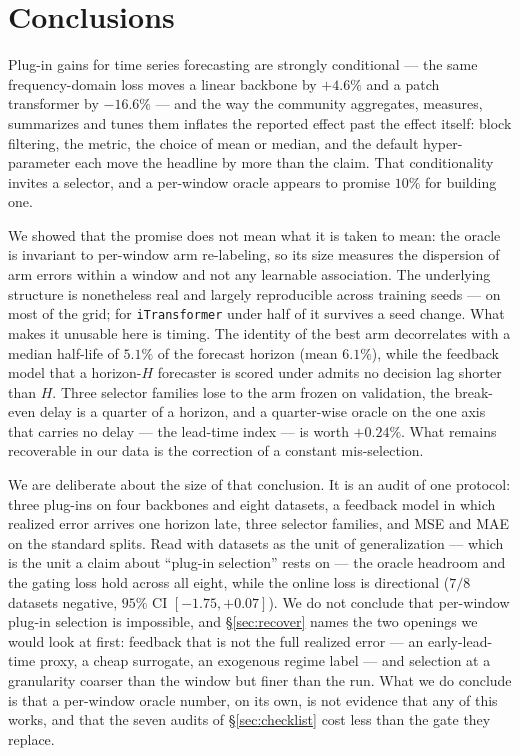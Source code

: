 \documentclass[a4paper,fleqn]{cas-sc}
\newcommand{\arm}[1]{\texttt{#1}}
\begin{document}
\section{Conclusions}

Plug-in gains for time series forecasting are strongly conditional --- the same
frequency-domain loss moves a linear backbone by $+4.6\%$ and a patch
transformer by $-16.6\%$ --- and the way the community aggregates, measures,
summarizes and tunes them inflates the reported effect past the effect itself:
block filtering, the metric, the choice of mean or median, and the default
hyper-parameter each move the headline by more than the claim. That
conditionality invites a selector, and a per-window oracle appears to promise
$10\%$ for building one.

We showed that the promise does not mean what it is taken to mean: the oracle is
invariant to per-window arm re-labeling, so its size measures the dispersion of arm
errors within a window and not any learnable association. The underlying structure
is nonetheless real and largely reproducible across training seeds --- on most of
the grid; for \arm{iTransformer} under half of it survives a seed change. What
makes it unusable here is timing. The identity of the best arm decorrelates with a
median half-life of $5.1\%$ of the forecast horizon (mean $6.1\%$), while the
feedback model that a horizon-$H$ forecaster is scored under admits no decision lag
shorter than $H$. Three selector families lose to the arm frozen on validation, the
break-even delay is a quarter of a horizon, and a quarter-wise oracle on the one
axis that carries no delay --- the lead-time index --- is worth $+0.24\%$. What
remains recoverable in our data is the correction of a constant mis-selection.

We are deliberate about the size of that conclusion. It is an audit of one
protocol: three plug-ins on four backbones and eight datasets, a feedback model in
which realized error arrives one horizon late, three selector families, and MSE and
MAE on the standard splits. Read with datasets as the unit of generalization ---
which is the unit a claim about ``plug-in selection'' rests on --- the oracle
headroom and the gating loss hold across all eight, while the online loss is
directional ($7/8$ datasets negative, $95\%$ CI $[-1.75, +0.07]$). We do not
conclude that per-window plug-in selection is impossible, and \S\ref{sec:recover}
names the two openings we would look at first: feedback that is not the full
realized error --- an early-lead-time proxy, a cheap surrogate, an exogenous regime
label --- and selection at a granularity coarser than the window but finer than the
run. What we do conclude is that a per-window oracle number, on its own, is not
evidence that any of this works, and that the seven audits of
\S\ref{sec:checklist} cost less than the gate they replace.
\end{document}
